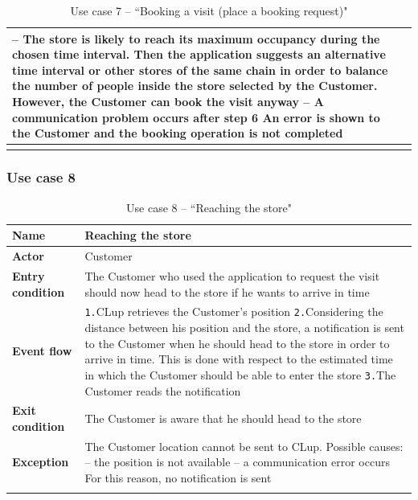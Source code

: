 \documentclass[a4paper,oneside,11pt]{book}   %
\begin{document}
\begin{longtable}[c] { |>{\bfseries{}}C{0.25\textwidth}|H{0.55\textwidth}| }
        -- The store is likely to reach its maximum occupancy during the chosen time interval. Then the application suggests an alternative time interval or other stores of the same chain in order to balance the number of people inside the store selected by the Customer. However, the Customer can book the visit anyway \newline
        -- A communication problem occurs after step 6 \newline
        An error is shown to the Customer and the booking operation is not completed \\
        \hline
    \caption{Use case 7 -- ``Booking a visit (place a booking request)"}
    \label{table:use_case_07}
    \end{longtable}
    
    \subsubsection{Use case 8}
    \begin{longtable}[c] { |>{\bfseries{}}C{0.25\textwidth}|H{0.55\textwidth}| }
        \hline
        Name            & Reaching the store \\ \hline
        Actor           & Customer \\ \hline
        Entry condition & The Customer who used the application to request the visit should now head to the store if he wants to arrive in time  \\ \hline
        Event flow      & 
        \texttt{1.}CLup retrieves the Customer’s position \newline
        \texttt{2.}Considering the distance between his position and the store, a notification is sent to the Customer when he should head to the store in order to arrive in time. This is done with respect to the estimated time in which the Customer should be able to enter the store \newline
        \texttt{3.}The Customer reads the notification \\ \hline
        Exit condition  & The Customer is aware that he should head to the store \\ \hline
        Exception       & The Customer location cannot be sent to CLup. Possible causes: \newline
        -- the position is not available \newline
        -- a communication error occurs \newline
        For this reason, no notification is sent \\
        \hline
    \caption{Use case 8 -- ``Reaching the store"}
    \label{table:use_case_08}
    \end{longtable}
    
\end{document}
